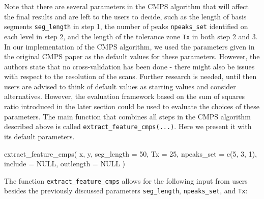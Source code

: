Note that there are several parameters in the CMPS algorithm that will
affect the final results and are left to the users to decide, such as
the length of basis segments \texttt{seg\_length} in step 1, the number
of peaks \texttt{npeaks\_set} identified on each level in step 2, and
the length of the tolerance zone \texttt{Tx} in both step 2 and 3. In
our implementation of the CMPS algorithm, we used the parameters given
in the original CMPS paper \citep{cmps} as the default values for these
parameters. However, the authors state that no cross-validation has been
done - there might also be issues with respect to the resolution of the
scans. Further research is needed, until then users are advised to think
of default values as starting values and consider alternatives. However,
the evaluation framework based on the sum of squares ratio introduced in
the later section could be used to evaluate the choices of these
parameters. The main function that combines all steps in the CMPS
algorithm described above is called
\texttt{extract\_feature\_cmps(...)}. Here we present it with its
default parameters.

\begin{Schunk}
\begin{Sinput}
extract_feature_cmps(
  x,
  y,
  seg_length = 50,
  Tx = 25,
  npeaks_set = c(5, 3, 1),
  include = NULL,
  outlength = NULL
)
\end{Sinput}
\end{Schunk}

The function \texttt{extract\_feature\_cmps} allows for the following
input from users besides the previously discussed parameters
\texttt{seg\_length}, \texttt{npeaks\_set}, and \texttt{Tx}:

